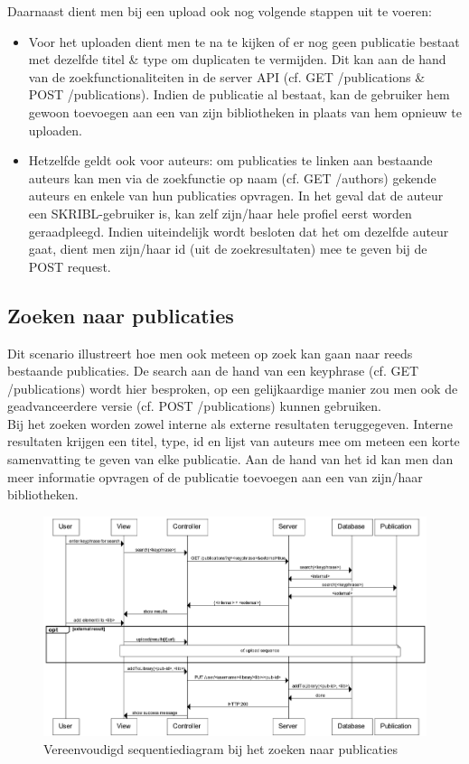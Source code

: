\documentclass{article}
\begin{document}
Daarnaast dient men bij een upload ook nog volgende stappen uit te voeren:

\begin{itemize}

\item Voor het uploaden dient men te na te kijken of er nog geen publicatie bestaat met dezelfde titel \& type om duplicaten te vermijden. Dit kan aan de hand van de zoekfunctionaliteiten in de server API (cf. GET /publications \& POST /publications). Indien de publicatie al bestaat, kan de gebruiker hem gewoon toevoegen aan een van zijn bibliotheken in plaats van hem opnieuw te uploaden.

\item Hetzelfde geldt ook voor auteurs: om publicaties te linken aan bestaande auteurs kan men via de zoekfunctie op naam (cf. GET /authors) gekende auteurs en enkele van hun publicaties opvragen. In het geval dat de auteur een SKRIBL-gebruiker is, kan zelf zijn/haar hele profiel eerst worden geraadpleegd. Indien uiteindelijk wordt besloten dat het om dezelfde auteur gaat, dient men zijn/haar id (uit de zoekresultaten) mee te geven bij de POST request.

\end{itemize}

\subsection{Zoeken naar publicaties}

Dit scenario illustreert hoe men ook meteen op zoek kan gaan naar reeds bestaande publicaties. De search aan de hand van een keyphrase (cf. GET /publications) wordt hier besproken, op een gelijkaardige manier zou men ook de geadvanceerdere versie (cf. POST /publications) kunnen gebruiken. \\

Bij het zoeken worden zowel interne als externe resultaten teruggegeven. Interne resultaten krijgen een titel, type, id en lijst van auteurs mee om meteen een korte samenvatting te geven van elke publicatie. Aan de hand van het id kan men dan meer informatie opvragen of de publicatie toevoegen aan een van zijn/haar bibliotheken. \\

\begin{figure}[!h]
\centering
 \includegraphics[width=140mm]{search-sequence.png}
 \caption{Vereenvoudigd sequentiediagram bij het zoeken naar publicaties}
 \label{upload-sequence}
\end{figure}
\end{document}
